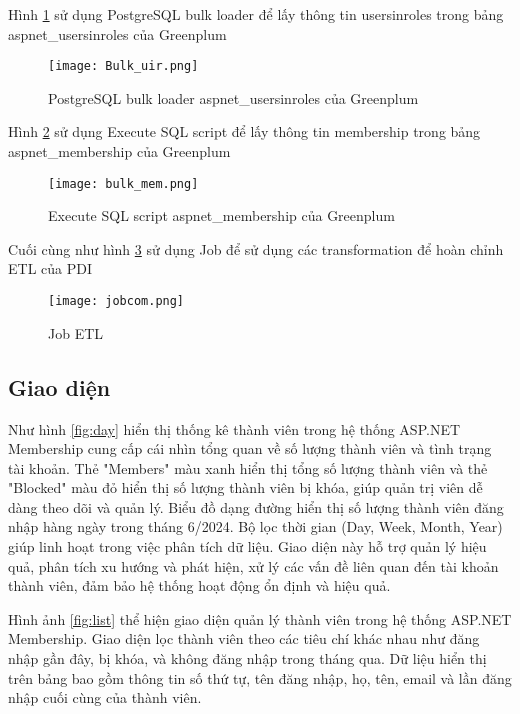Hình \ref{fig:Bulk_uir} sử dụng PostgreSQL bulk loader để lấy thông tin usersinroles trong bảng aspnet\_usersinroles của Greenplum


\begin{figure}
    \centering
    \texttt{[image: Bulk\_uir.png]}
    \caption{PostgreSQL bulk loader aspnet\_usersinroles của Greenplum}
    \label{fig:Bulk_uir}
\end{figure}


Hình \ref{fig:bulk_mem} sử dụng Execute SQL script để lấy thông tin membership trong bảng aspnet\_membership của Greenplum


\begin{figure}
    \centering
    \texttt{[image: bulk\_mem.png]}
     \caption{Execute SQL script aspnet\_membership của Greenplum}
    \label{fig:bulk_mem}
\end{figure}






Cuối cùng như hình \ref{fig:job} sử dụng Job để sử dụng các transformation để hoàn chỉnh ETL của PDI


\begin{figure}
    \centering
    \texttt{[image: jobcom.png]}
    \caption{Job ETL}
    \label{fig:job}
\end{figure}


\subsection{Giao diện}



Như hình \ref{fig:day} hiển thị thống kê thành viên trong hệ thống ASP.NET Membership cung cấp cái nhìn tổng quan về số lượng thành viên và tình trạng tài khoản. Thẻ "Members" màu xanh hiển thị tổng số lượng thành viên và thẻ "Blocked" màu đỏ hiển thị số lượng thành viên bị khóa, giúp quản trị viên dễ dàng theo dõi và quản lý. Biểu đồ dạng đường hiển thị số lượng thành viên đăng nhập hàng ngày trong tháng 6/2024. Bộ lọc thời gian (Day, Week, Month, Year) giúp linh hoạt trong việc phân tích dữ liệu. Giao diện này hỗ trợ quản lý hiệu quả, phân tích xu hướng và phát hiện, xử lý các vấn đề liên quan đến tài khoản thành viên, đảm bảo hệ thống hoạt động ổn định và hiệu quả.




Hình ảnh \ref{fig:list} thể hiện giao diện quản lý thành viên trong hệ thống ASP.NET Membership. Giao diện lọc thành viên theo các tiêu chí khác nhau như đăng nhập gần đây, bị khóa, và không đăng nhập trong tháng qua. Dữ liệu hiển thị trên bảng bao gồm thông tin số thứ tự, tên đăng nhập, họ, tên, email và lần đăng nhập cuối cùng của thành viên.

